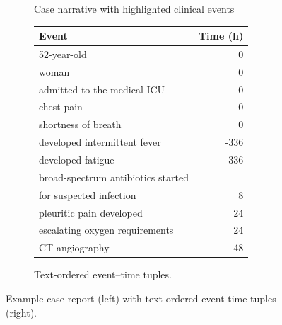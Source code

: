 \begin{figure}[t]
\begin{subfigure}[t]{0.49\textwidth}
\begin{tcolorbox}
    \end{tcolorbox}
    \caption{Case narrative with highlighted clinical events}
    \label{fig:narrative_box}
  \end{subfigure}\hfill%
  \begin{subfigure}[t]{0.49\textwidth}\vspace{0pt}
    \begin{tcolorbox}
    [
    colback=white,
    colframe=black!30,
    arc=2mm,
    boxrule=0.6pt,
    left=2mm,right=2mm,top=2mm,bottom=2mm
    ]
      \small\centering
      \setlength{\tabcolsep}{5pt}
      \begin{tabular}{@{} l r @{}}
        \toprule
        \textbf{Event} & \textbf{Time (h)} \\
        \midrule
        52-year-old & 0 \\
        woman & 0 \\
        admitted to the medical ICU & 0 \\
        chest pain & 0 \\
        shortness of breath & 0 \\
        developed intermittent fever & -336 \\
        developed fatigue & -336 \\
        broad-spectrum antibiotics started \\ for suspected infection & 8 \\
        pleuritic pain developed & 24 \\
        escalating oxygen requirements & 24 \\
        CT angiography & 48 \\
        \bottomrule
      \end{tabular}
    \end{tcolorbox}
    \caption{Text-ordered event–time tuples.}
    \label{fig:table_box}
  \end{subfigure}

  \caption{Example case report (left) with text-ordered event-time tuples (right).
  }
  \label{fig:annotation_ex}
  \vspace{-5mm}
\end{figure}



